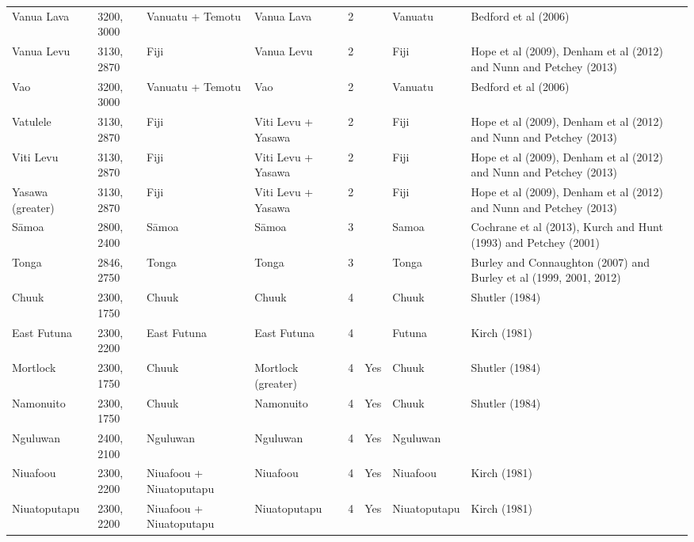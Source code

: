 \begin{longtable}{p{2cm}p{2cm}p{2cm}p{2cm}p{2cm}p{2cm}p{2cm}p{2cm}p{2cm}}
  Vanua Lava & 3200, 3000 & Vanuatu + Temotu & Vanua Lava & 2 &  & Vanuatu & Bedford et al (2006) & \citet{rieth_cochrane_2018} \\ 
  Vanua Levu & 3130, 2870 & Fiji & Vanua Levu & 2 &  & Fiji & Hope et al (2009), Denham et al (2012) and Nunn and Petchey (2013) & \citet{rieth_cochrane_2018} \\ 
  Vao & 3200, 3000 & Vanuatu + Temotu & Vao & 2 &  & Vanuatu & Bedford et al (2006) & \citet{rieth_cochrane_2018} \\ 
  Vatulele & 3130, 2870 & Fiji & Viti Levu + Yasawa & 2 &  & Fiji & Hope et al (2009), Denham et al (2012) and Nunn and Petchey (2013) & \citet{rieth_cochrane_2018} \\ 
  Viti Levu & 3130, 2870 & Fiji & Viti Levu + Yasawa & 2 &  & Fiji & Hope et al (2009), Denham et al (2012) and Nunn and Petchey (2013) & \citet{rieth_cochrane_2018} \\ 
  Yasawa (greater) & 3130, 2870 & Fiji & Viti Levu + Yasawa & 2 &  & Fiji & Hope et al (2009), Denham et al (2012) and Nunn and Petchey (2013) & \citet{rieth_cochrane_2018} \\ 
  Sāmoa & 2800, 2400 & Sāmoa & Sāmoa & 3 &  & Samoa & Cochrane et al (2013), Kurch and Hunt (1993) and Petchey (2001) & \citet{rieth_cochrane_2018} \\ 
  Tonga & 2846, 2750 & Tonga & Tonga & 3 &  & Tonga & Burley and Connaughton (2007) and Burley et al (1999, 2001, 2012) & \citet{rieth_cochrane_2018} \\ 
  Chuuk & 2300, 1750 & Chuuk & Chuuk & 4 &  & Chuuk & Shutler (1984) & \citet{rieth_cochrane_2018} \\ 
  East Futuna & 2300, 2200 & East Futuna & East Futuna & 4 &  & Futuna & Kirch (1981) & \citet{rieth_cochrane_2018} \\ 
  Mortlock & 2300, 1750 & Chuuk & Mortlock (greater) & 4 & Yes & Chuuk & Shutler (1984) & \citet{rieth_cochrane_2018} \\ 
  Namonuito & 2300, 1750 & Chuuk & Namonuito & 4 & Yes & Chuuk & Shutler (1984) & \citet{rieth_cochrane_2018} \\ 
  Nguluwan & 2400, 2100 & Nguluwan & Nguluwan & 4 & Yes & Nguluwan & \citet{Napolitano_et_al_yap} &  \\ 
  Niuafoou & 2300, 2200 & Niuafoou + Niuatoputapu & Niuafoou & 4 & Yes & Niuafoou & Kirch (1981) & \citet{rieth_cochrane_2018} \\ 
  Niuatoputapu & 2300, 2200 & Niuafoou + Niuatoputapu & Niuatoputapu & 4 & Yes & Niuatoputapu & Kirch (1981) & \citet{rieth_cochrane_2018} \\ 

\end{longtable}
